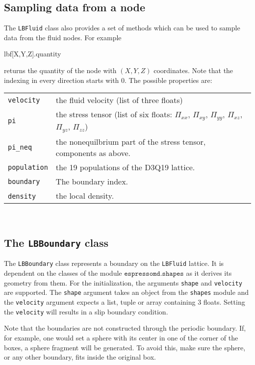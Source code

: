 \subsection*{Sampling data from a node}
The \texttt{LBFluid} class also provides a set of methods which can be used to
sample data from the fluid nodes. For example 
\vspace{0,2cm}
\begin{pypresso}
  lbf[X,Y,Z].quantity
\end{pypresso}
\vspace{0,2cm}
returns the quantity of the node with $(X,Y,Z)$ coordinates. Note that the
indexing in every direction starts with 0. The possible properties are:
\vspace{0,8cm}
\begin{tabular}{p{}p{}}
  \texttt{velocity} & the fluid velocity (list of three floats) \\
  \texttt{pi} & the stress tensor (list of six floats: $\Pi_{xx}$, $\Pi_{xy}$, $\Pi_{yy}$, $\Pi_{xz}$,  $\Pi_{yz}$,  $\Pi_{zz}$) \\
  \texttt{pi\_neq} & the nonequilbrium part of the stress tensor, components as above. \\
  \texttt{population} & the 19 populations of the D3Q19 lattice.\\
  \texttt{boundary} & The boundary index.\\
  \texttt{density}\ & the local density. 
\end{tabular} \\
\vspace{0,8cm}

\subsection*{The \texttt{LBBoundary} class}
The \texttt{LBBoundary} class represents a boundary on the \texttt{LBFluid}
lattice. It is dependent on the classes of the module $\texttt{espressomd.shapes}$ as it
derives its geometry from them. For the initialization, the arguments
\texttt{shape} and \texttt{velocity} are supported. The \texttt{shape} argument
takes an object from the \texttt{shapes} module and the \texttt{velocity}
argument expects a list, tuple or array containing 3 floats. Setting the
\texttt{velocity} will results in a slip boundary condition.

Note that the boundaries are not constructed
through the periodic boundary. If, for example, one would set a sphere with
its center in one of the corner of the boxes, a sphere fragment will be
generated. To avoid this, make sure the sphere, or any other boundary, fits
inside the original box.

